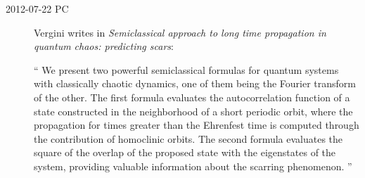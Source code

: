 \begin{description}
\item[2012-07-22 PC]
Vergini writes in {\em Semiclassical approach to long time
propagation in quantum chaos: predicting scars}:

``
We present two powerful semiclassical formulas for quantum systems with
classically chaotic dynamics, one of them being the Fourier transform of
the other. The first formula evaluates the autocorrelation function of a
state constructed in the neighborhood of a short periodic orbit, where
the propagation for times greater than the Ehrenfest time is computed
through the contribution of homoclinic orbits. The second formula
evaluates the square of the overlap of the proposed state with the
eigenstates of the system, providing valuable information about the
scarring phenomenon.
''
\end{description}

